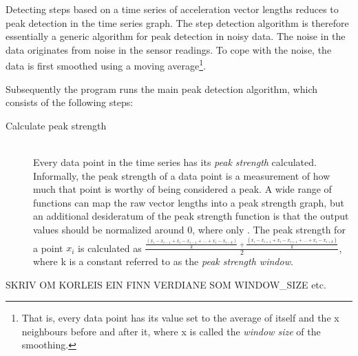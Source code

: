 Detecting steps based on a time series of acceleration vector lengths reduces to peak detection in the time series graph. The step detection algorithm is therefore essentially a generic algorithm for peak detection in noisy data. The noise in the data originates from noise in the sensor readings. To cope with the noise, the data is first smoothed using a moving average\footnote{That is, every data point has its value set to the average of itself and the x neighbours before and after it, where x is called the \emph{window size} of the smoothing.}.

Subsequently the program runs the main peak detection algorithm, which consists of the following steps:
\begin{description}
\item[Calculate peak strength] \hfill \\
Every data point in the time series has its \emph{peak strength} calculated. Informally, the peak strength of a data point is a measurement of how much that point is worthy of being considered a peak. A wide range of functions can map the raw vector lengths into a peak strength graph, but an additional desideratum of the peak strength function is that the output values should be normalized around 0, where only . The peak strength for a point $x_i$ is calculated as $\frac{\frac{(x_{i} - x_{i-1} + x_{i} - x_{i-1} + \ldots + x_{i} - x_{i-k})}{k} + \frac{(x_{i} - x_{i+1} + x_{i} - x_{i+1} + \ldots + x_{i} - x_{i+k})}{k}}{2}$, where k is a constant referred to as the \emph{peak strength window}.
\end{description}

SKRIV OM KORLEIS EIN FINN VERDIANE SOM WINDOW\_SIZE etc. 
